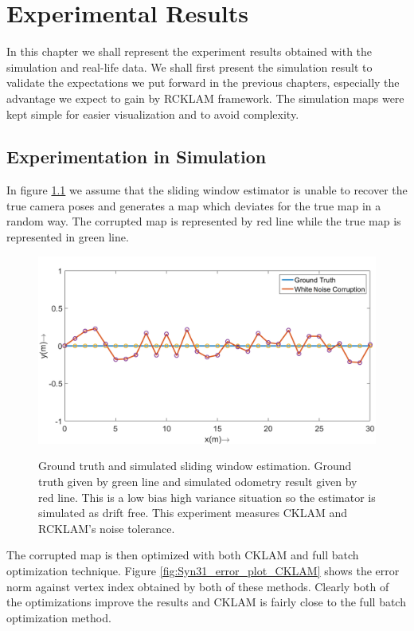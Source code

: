 \chapter{Experimental Results}
\label{chap:ExptAndResults}
  In this chapter we shall represent the experiment results obtained with the simulation and real-life data. We shall first present the simulation result to validate the expectations we put forward in the previous chapters, especially the advantage we expect to gain by RCKLAM framework. The simulation maps were kept simple for easier visualization and to avoid complexity.
  
\section{Experimentation in Simulation}
\label{sec:SimulationExpt}

  In figure \ref{fig:Syn31_map} we assume that the sliding window estimator is unable to recover the true camera poses and generates a map which deviates for the true map in a random way. The corrupted map is represented by red line while the true map is represented in green line.
  
  
\begin{figure}
  \centering
    \includegraphics[width=1.00\textwidth]{images/Syn31_map.png}
  \label{fig:Syn31_map}
  \caption{Ground truth and simulated sliding window estimation. Ground truth given by green line and simulated odometry result given by red line. This is a low bias high variance situation so the estimator is simulated as drift free. This experiment measures CKLAM and RCKLAM's noise tolerance.}
\end{figure}
  
  
  The corrupted map is then optimized with both CKLAM and full batch optimization technique. Figure \ref{fig:Syn31_error_plot_CKLAM} shows the error norm against vertex index obtained by both of these methods. Clearly both of the optimizations improve the results and CKLAM is fairly close to the full batch optimization method. 
  
